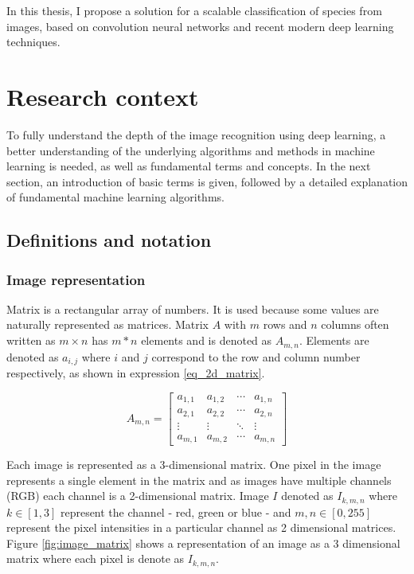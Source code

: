 \documentclass[times, utf8, diplomski]{fer}
\begin{document}
In this thesis, I propose a solution for a scalable classification of species from images, based on convolution neural networks and recent modern deep learning techniques.

\chapter{Research context}
To fully understand the depth of the image recognition using deep learning, a better understanding of the underlying algorithms and methods in machine learning is needed, as well as fundamental terms and concepts. In the next section, an introduction of basic terms is given, followed by a detailed explanation of fundamental machine learning algorithms.

\section{Definitions and notation}

\subsection{Image representation}
Matrix is a rectangular array of numbers. It is used because some values are naturally represented as matrices. Matrix $A$ with $m$ rows and $n$ columns often written as $m \times n$ has $m*n$ elements and is denoted as $A_{m,n}$. Elements are denoted as $a_{i,j}$ where $i$ and $j$ correspond to the row and column number respectively, as shown in expression \ref{eq_2d_matrix}. 

\begin{equation} \label{eq_2d_matrix}
A_{m,n} = 
 \begin{bmatrix}
  a_{1,1} & a_{1,2} & \cdots & a_{1,n} \\
  a_{2,1} & a_{2,2} & \cdots & a_{2,n} \\
  \vdots  & \vdots  & \ddots & \vdots  \\
  a_{m,1} & a_{m,2} & \cdots & a_{m,n} 
 \end{bmatrix}
\end{equation}


Each image is represented as a 3-dimensional matrix. One pixel in the image represents a single element in the matrix and as images have multiple channels (RGB) each channel is a 2-dimensional matrix. Image $I$ denoted as $I_{k,m,n}$ where $k\in[1,3]$ represent the channel - red, green or blue - and $m,n\in[0,255]$ represent the pixel intensities in a particular channel as 2 dimensional matrices. Figure \ref{fig:image_matrix} shows a representation of an image as a 3 dimensional matrix where each pixel is denote as $I_{k,m,n}$.
\end{document}
